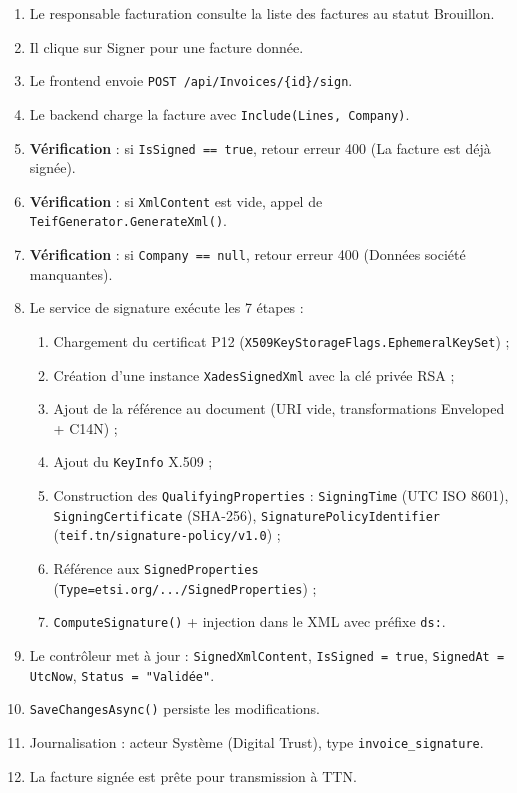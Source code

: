 \documentclass[a4paper,12pt]{report}
\begin{document}
\begin{enumerate}[nosep]
    \item Le responsable facturation consulte la liste des factures au statut \og{}Brouillon\fg{}.
    \item Il clique sur \og{}Signer\fg{} pour une facture donnée.
    \item Le frontend envoie \texttt{POST /api/Invoices/\{id\}/sign}.
    \item Le backend charge la facture avec \texttt{Include(Lines, Company)}.
    \item \textbf{Vérification} : si \texttt{IsSigned == true}, retour erreur 400 (\og{}La facture est déjà signée\fg{}).
    \item \textbf{Vérification} : si \texttt{XmlContent} est vide, appel de \texttt{TeifGenerator.GenerateXml()}.
    \item \textbf{Vérification} : si \texttt{Company == null}, retour erreur 400 (\og{}Données société manquantes\fg{}).
    \item Le service de signature exécute les 7 étapes :
    \begin{enumerate}[nosep, label=\alph*)]
        \item Chargement du certificat P12 (\texttt{X509KeyStorageFlags.EphemeralKeySet}) ;
        \item Création d'une instance \texttt{XadesSignedXml} avec la clé privée RSA ;
        \item Ajout de la référence au document (URI vide, transformations Enveloped + C14N) ;
        \item Ajout du \texttt{KeyInfo} X.509 ;
        \item Construction des \texttt{QualifyingProperties} : \texttt{SigningTime} (UTC ISO 8601), \texttt{SigningCertificate} (SHA-256), \texttt{SignaturePolicyIdentifier} (\texttt{teif.tn/signature-policy/v1.0}) ;
        \item Référence aux \texttt{SignedProperties} (\texttt{Type=etsi.org/.../SignedProperties}) ;
        \item \texttt{ComputeSignature()} + injection dans le XML avec préfixe \texttt{ds:}.
    \end{enumerate}
    \item Le contrôleur met à jour : \texttt{SignedXmlContent}, \texttt{IsSigned = true}, \texttt{SignedAt = UtcNow}, \texttt{Status = "Validée"}.
    \item \texttt{SaveChangesAsync()} persiste les modifications.
    \item Journalisation : acteur \og{}Système (Digital Trust)\fg{}, type \texttt{invoice\_signature}.
    \item La facture signée est prête pour transmission à TTN.
\end{enumerate}
\end{document}
